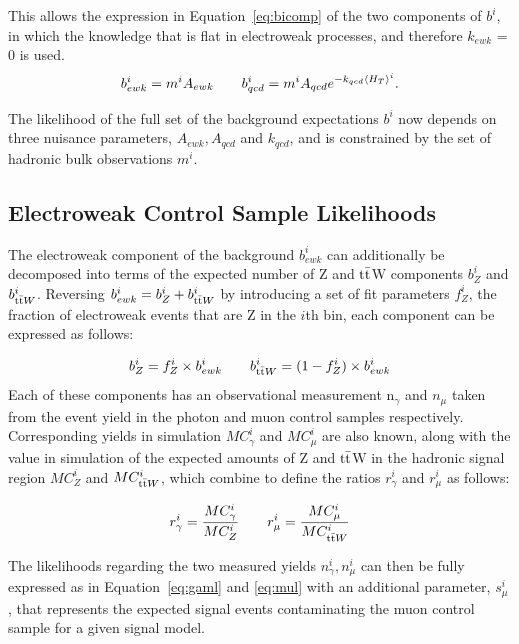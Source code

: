 This allows the expression in Equation~\ref{eq:bicomp} of the two components of $b^{i}$, in which the knowledge that \RaT is flat in electroweak processes, and therefore $k_{ewk}$ = 0 is used.
\begin{equation}
b^{i}_{ewk} = m^{i} A_{ewk} \qquad
b^{i}_{qcd} = m^{i} A_{qcd} e^{-k_{qcd} \langle H_{T} \rangle^{i}}.
\label{eq:bicomp}
\end{equation}

The likelihood of the full set of the background expectations $b^{i}$ now depends on three nuisance parameters, $A_{ewk}, A_{qcd}$ and $k_{qcd}$, and is constrained by the set of hadronic bulk observations $m^{i}$. 

\subsection{Electroweak Control Sample Likelihoods}
The electroweak component of the background $b^{i}_{ewk}$ can additionally be decomposed into terms of the expected number of Z and $\textrm{t}\bar{\textrm{t}}$W components $b^{i}_{Z}$ and  $b^{i}_{\textrm{t}\bar{\textrm{t}} W}$. Reversing $b^{i}_{ewk} = b^{i}_{Z} + b^{i}_{\textrm{t}\bar{\textrm{t}} W}$ by introducing a set of fit parameters $f^{i}_{Z}$, the fraction of electroweak events that are Z in the $i$th bin, each component can be expressed as follows:

\begin{equation}
b^{i}_{Z}= f^{i}_{Z} \times b^{i}_{ewk} \qquad b^{i}_{\textrm{t}\bar{\textrm{t}} W}= (1 - f^{i}_{Z}) \times b^{i}_{ewk}
\label{eq:ewk1}
\end{equation}
 Each of these components has an observational measurement n$_{\gamma}$ and $n_{\mu}$ taken from the event yield in the photon and muon control samples respectively. Corresponding yields in simulation $MC^{i}_{\gamma}$ and $MC^{i}_{\mu}$ are also known, along with the value in simulation of the expected amounts of Z and $\textrm{t}\bar{\textrm{t}}$W in the hadronic signal region $MC^{i}_{Z}$ and $MC^{i}_{\textrm{t}\bar{\textrm{t}} W}$, which combine to define the ratios $r^{i}_{\gamma}$ and $r^{i}_{\mu}$ as follows:
 
 \begin{equation}
 r^{i}_{\gamma} = \frac{MC^{i}_{\gamma}}{MC^{i}_{Z}} \qquad  r^{i}_{\mu} = \frac{MC^{i}_{\mu}}{MC^{i}_{\textrm{t}\bar{\textrm{t}} W}} 
 \label{eq:ewk2}
 \end{equation}

The likelihoods regarding the two measured yields $n^{i}_{\gamma}, n^{i}_{\mu}$ can then be fully expressed as in Equation~\ref{eq:gaml} and \ref{eq:mul} with an additional parameter, $s^{i}_{\mu}$, that represents the expected signal events contaminating the muon control sample for a given signal model. 

